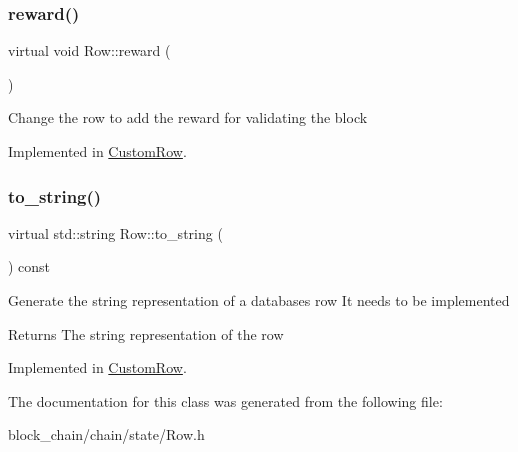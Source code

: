 \subsubsection{\texorpdfstring{reward()}{reward()}}
{\footnotesize\ttfamily virtual void Row\+::reward (\begin{DoxyParamCaption}{ }\end{DoxyParamCaption})\hspace{0.3cm}{\ttfamily [pure virtual]}}

Change the row to add the reward for validating the block 

Implemented in \mbox{\hyperlink{classCustomRow_a007002dc965ca2727ec8db0183404bf1}{Custom\+Row}}.

\mbox{\label{classRow_ae7b1aba7a4c868914700432850c2848d}} 
\subsubsection{\texorpdfstring{to\+\_\+string()}{to\_string()}}
{\footnotesize\ttfamily virtual std\+::string Row\+::to\+\_\+string (\begin{DoxyParamCaption}{ }\end{DoxyParamCaption}) const\hspace{0.3cm}{\ttfamily [pure virtual]}}

Generate the string representation of a database\textquotesingle{}s row It needs to be implemented

\begin{DoxyReturn}{Returns}
The string representation of the row 
\end{DoxyReturn}


Implemented in \mbox{\hyperlink{classCustomRow_ae1e5a3b861829f8b295d3c743d6b3c7a}{Custom\+Row}}.



The documentation for this class was generated from the following file\+:\begin{DoxyCompactItemize}
\item 
block\+\_\+chain/chain/state/Row.\+h\end{DoxyCompactItemize}
